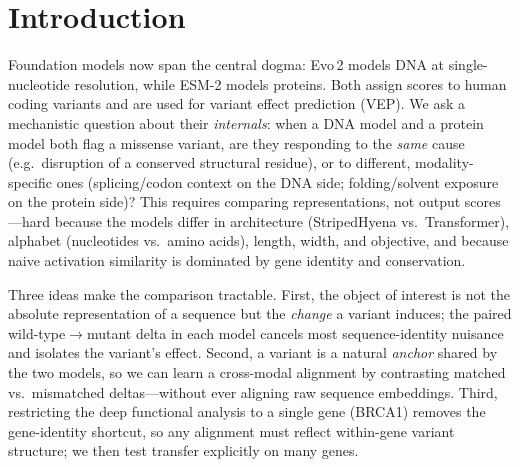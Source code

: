\documentclass[10pt]{article}
\begin{document}
\section{Introduction}
Foundation models now span the central dogma: Evo\,2 \citep{brixi2026evo2} models DNA at
single-nucleotide resolution, while ESM-2 \citep{lin2023esm2} models proteins. Both assign
scores to human coding variants and are used for variant effect prediction (VEP). We ask a
mechanistic question about their \emph{internals}: when a DNA model and a protein model both
flag a missense variant, are they responding to the \emph{same} cause (e.g.\ disruption of a
conserved structural residue), or to different, modality-specific ones (splicing/codon context
on the DNA side; folding/solvent exposure on the protein side)? This requires comparing
representations, not output scores---hard because the models differ in architecture
(StripedHyena vs.\ Transformer), alphabet (nucleotides vs.\ amino acids), length, width, and
objective, and because naive activation similarity is dominated by gene identity and
conservation.

Three ideas make the comparison tractable. First, the object of interest is not the absolute
representation of a sequence but the \emph{change} a variant induces; the paired
wild-type$\to$mutant delta in each model cancels most sequence-identity nuisance and isolates
the variant's effect. Second, a variant is a natural \emph{anchor} shared by the two models, so
we can learn a cross-modal alignment by contrasting matched vs.\ mismatched deltas---without
ever aligning raw sequence embeddings. Third, restricting the deep functional analysis to a
single gene (BRCA1) removes the gene-identity shortcut, so any alignment must reflect
within-gene variant structure; we then test transfer explicitly on many genes.
\end{document}
